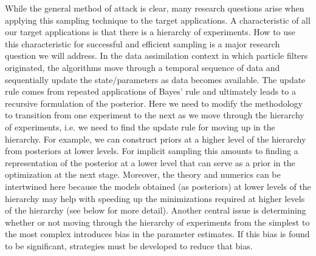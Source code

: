 \documentclass[11pt]{article}
\begin{document}
While the general method of attack is clear, many research questions arise when applying this sampling technique to the target applications. A characteristic of all our target applications is that there is a hierarchy of experiments. How to use this characteristic for successful and efficient sampling is a major research question we will address. In the data assimilation context in which particle filters originated, the algorithms move through a temporal sequence of data and sequentially update the state/parameters as data becomes available. The update rule comes from repeated applications of Bayes' rule and ultimately leads to a recursive formulation of the posterior. Here we need to modify the methodology to transition from one experiment to the next as we move through the hierarchy of experiments, i.e. we need to find the update rule for moving up in the hierarchy. For example, we can construct priors at a higher level of the hierarchy from posteriors at lower levels. For implicit sampling this amounts to finding a representation of the posterior at a lower level that can serve as a prior in the optimization at the next stage. Moreover, the theory and numerics can be intertwined here because the models obtained (as posteriors) at lower levels of the hierarchy may help with speeding up the minimizations required at higher levels of the hierarchy (see below for more detail).  Another central issue is determining whether or not moving through the hierarchy of experiments from the simplest to the most complex introduces bias in the parameter estimates. If this bias is found to be significant, strategies must be developed to reduce that bias. 
\end{document}
